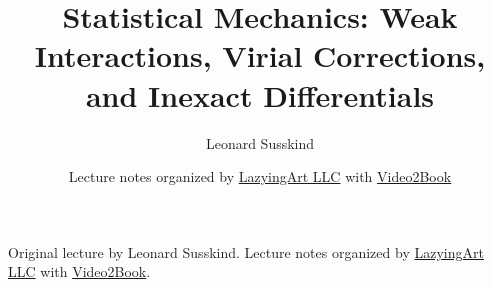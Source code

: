 \documentclass[11pt,oneside]{book}
\begin{document}
\frontmatter
\hypersetup{pageanchor=false}
\title{Statistical Mechanics: Weak Interactions, Virial Corrections, and Inexact Differentials}
\author{Leonard Susskind}
\date{Lecture notes organized by \href{https://lazying.art}{LazyingArt LLC} with \href{https://github.com/lachlanchen/Video2Book}{Video2Book}}
\maketitle
\begin{center}
\small Original lecture by Leonard Susskind. Lecture notes organized by \href{https://lazying.art}{LazyingArt LLC} with \href{https://github.com/lachlanchen/Video2Book}{Video2Book}.
\end{center}
\clearpage
\hypersetup{pageanchor=true}
\mainmatter

\end{document}
